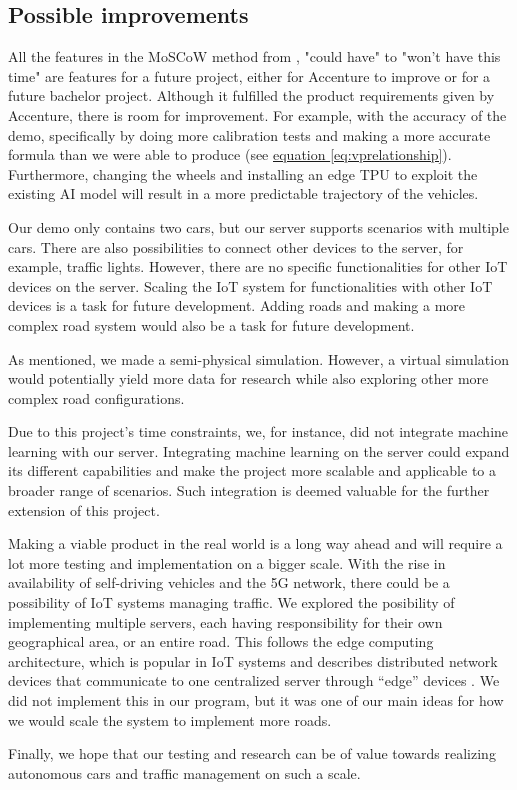 \subsection{Possible improvements}
All the features in the MoSCoW method from , "could have" to "won't have this time" are features for a future project, either for Accenture to improve or for a future bachelor project. Although it fulfilled the product requirements given by Accenture, there is room for improvement. For example, with the accuracy of the demo, specifically by doing more calibration tests and making a more accurate formula than we were able to produce (see \hyperref[eq:vprelationship]{equation \eqref{eq:vprelationship}}). Furthermore, changing the wheels and installing an edge TPU to exploit the existing AI model will result in a more predictable trajectory of the vehicles.

Our demo only contains two cars, but our server supports scenarios with multiple cars. There are also possibilities to connect other devices to the server, for example, traffic lights. However, there are no specific functionalities for other IoT devices on the server. Scaling the IoT system for functionalities with other IoT devices is a task for future development. Adding roads and making a more complex road system would also be a task for future development.

As mentioned, we made a semi-physical simulation. However, a virtual simulation would potentially yield more data for research while also exploring other more complex road configurations.

Due to this project's time constraints, we, for instance, did not integrate machine learning with our server. Integrating machine learning on the server could expand its different capabilities and make the project more scalable and applicable to a broader range of scenarios. Such integration is deemed valuable for the further extension of this project.

Making a viable product in the real world is a long way ahead and will require a lot more testing and implementation on a bigger scale. With the rise in availability of self-driving vehicles and the 5G network, there could be a possibility of IoT systems managing traffic. We explored the posibility of implementing multiple servers, each  having responsibility for their own geographical area, or an entire road. This follows the edge computing architecture, which is popular in IoT systems and describes distributed network devices that communicate to one centralized server through ``edge'' devices \parencite[pp 149]{iot_platforms}. We did not implement this in our program, but it was one of our main ideas for how we would scale the system to implement more roads.

Finally, we hope that our testing and research can be of value towards realizing autonomous cars and traffic management on such a scale.